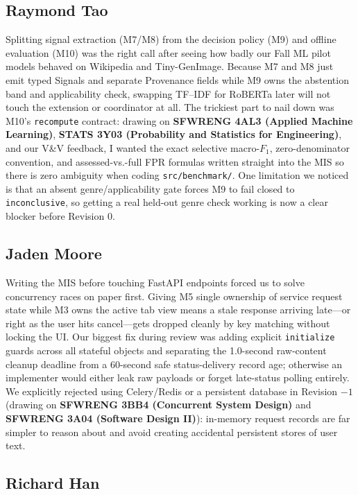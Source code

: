 \documentclass[12pt, titlepage]{article}
\newcommand{\ty}[1]{\textsf{#1}}
\begin{document}
\subsection{Raymond Tao}

Splitting signal extraction (M7/M8) from the decision policy (M9) and offline evaluation (M10) was the right call after seeing how badly our Fall ML pilot models behaved on Wikipedia and Tiny-GenImage. Because M7 and M8 just emit typed \ty{Signals} and separate \ty{Provenance} fields while M9 owns the abstention band and applicability check, swapping TF--IDF for RoBERTa later will not touch the extension or coordinator at all. The trickiest part to nail down was M10's \texttt{recompute} contract: drawing on \textbf{SFWRENG 4AL3 (Applied Machine Learning)}, \textbf{STATS 3Y03 (Probability and Statistics for Engineering)}, and our V\&V feedback, I wanted the exact selective macro-$F_1$, zero-denominator convention, and assessed-vs.-full FPR formulas written straight into the MIS so there is zero ambiguity when coding \texttt{src/benchmark/}. One limitation we noticed is that an absent genre/applicability gate forces M9 to fail closed to \texttt{inconclusive}, so getting a real held-out genre check working is now a clear blocker before Revision 0.

\subsection{Jaden Moore}

Writing the MIS before touching FastAPI endpoints forced us to solve concurrency races on paper first. Giving M5 single ownership of service request state while M3 owns the active tab view means a stale response arriving late---or right as the user hits cancel---gets dropped cleanly by key matching without locking the UI. Our biggest fix during review was adding explicit \texttt{initialize} guards across all stateful objects and separating the 1.0-second raw-content cleanup deadline from a 60-second safe status-delivery record age; otherwise an implementer would either leak raw payloads or forget late-status polling entirely. We explicitly rejected using Celery/Redis or a persistent database in Revision $-1$ (drawing on \textbf{SFWRENG 3BB4 (Concurrent System Design)} and \textbf{SFWRENG 3A04 (Software Design II)}): in-memory request records are far simpler to reason about and avoid creating accidental persistent stores of user text.

\subsection{Richard Han}
\end{document}
